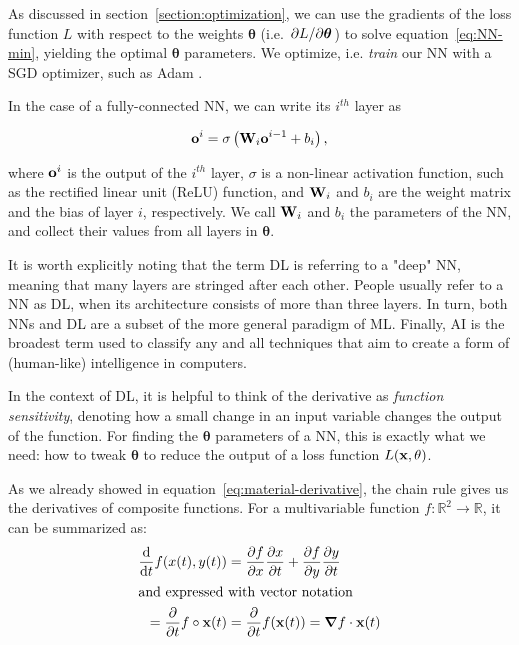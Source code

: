 As discussed in section~\ref{section:optimization}, we can use the
gradients of the loss function $L$ with respect to the weights
$\boldsymbol{\theta}$ (i.e. $\pdv*{L}{\boldsymbol\theta}$) to solve
equation~\eqref{eq:NN-min}, yielding the optimal $\boldsymbol{\theta}$
parameters. We optimize, i.e. \textit{train} our \ac{NN} with a \acf{SGD}
optimizer, such as Adam \cite{adam}.

In the case of a fully-connected \ac{NN}, we can write its $i^{th}$ layer as 

\begin{equation}\label{nn-single-layer-math}
    \vb{o}^i = \sigma\left(\vb{W}_i \vb{o}^{i-1} + b_i\right),
\end{equation}

where $\vb{o}^i$ is the output of the $i^{th}$ layer, $\sigma$ is a non-linear
activation function, such as the rectified linear unit (ReLU) function, and
$\vb{W}_i$ and $b_i$ are the weight matrix and the bias of layer $i$,
respectively. We call $\vb{W}_i$ and $b_i$ the parameters of the \ac{NN},
and collect their values from all layers in $\boldsymbol\theta$.

It is worth explicitly noting that the term \acf{DL} is referring to a "deep"
\acf{NN}, meaning that many layers are stringed after each other. People usually
refer to a \ac{NN} as \ac{DL}, when its architecture consists of more than three
layers. In turn, both \acp{NN} and \ac{DL} are a subset of the more general
paradigm of \acf{ML}. Finally, \acf{AI} is the broadest term used to classify
any and all techniques that aim to create a form of (human-like) intelligence in
computers.

In the context of \ac{DL}, it is helpful to think of the derivative as
\textit{function sensitivity}, denoting how a small change in an input variable
changes the output of the function.  For finding the $\boldsymbol\theta$
parameters of a \ac{NN}, this is exactly what we need: how to tweak
$\boldsymbol{\theta}$ to reduce the output of a loss function
$L(\vb{x},\vb{\theta})$.

As we already showed in equation~\eqref{eq:material-derivative}, the chain rule
gives us the derivatives of composite functions. For a multivariable function
$f: \mathbb{R}^2 \to \mathbb{R}$, it can be summarized as:
\begin{align}
    \dv{}{t}f(x(t), y(t)) &=  \pdv{f}{x}\pdv{x}{t} + \pdv{f}{y}\pdv{y}{t}\\
    \intertext{and expressed with vector notation}
    =\pdv{}{t}f \circ \vb{x}(t) &= \pdv{}{t}f(\vb{x}(t)) = \grad{f} \cdot \vb{x}(t)
\end{align}

